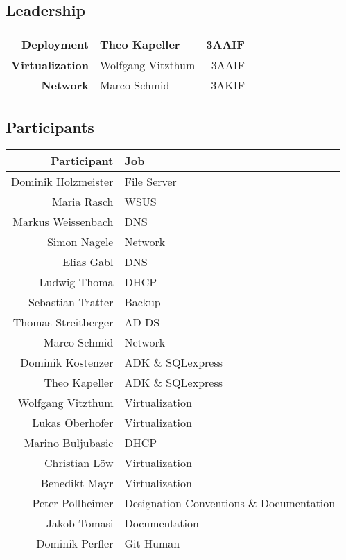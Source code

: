     
    \subsection{Leadership}
    \centering
    \begin{tabular}{rlr}
    	\hline 
    	\textbf{Deployment} & Theo Kapeller & 3AAIF \\ 
    	\hline 
    	\textbf{Virtualization} & Wolfgang Vitzthum & 3AAIF \\ 
    	\hline 
    	\textbf{Network} & Marco Schmid & 3AKIF \\ 
    	\hline 
    \end{tabular}
    \flushleft
    
    \subsection{Participants}
    \begin{table}[h]
    	\centering
		\begin{tabular}{r|l}
			\textbf{Participant} & \textbf{Job} \\ 
			\hline 
			Dominik Holzmeister & File Server \\ 

			\hline 
			Maria Rasch & WSUS \\ 
			\hline 
			Markus Weissenbach & DNS \\ 
			\hline 
			Simon Nagele & Network \\ 
			\hline 
			Elias Gabl & DNS \\ 
			\hline 
			Ludwig Thoma & DHCP \\ 
			\hline 
			Sebastian Tratter & Backup \\ 
			\hline 
			Thomas Streitberger & AD DS \\ 
			\hline 
			Marco Schmid & Network \\ 
			\hline 
			Dominik Kostenzer & ADK \& SQLexpress \\ 
			\hline 
			Theo Kapeller & ADK \& SQLexpress \\ 
			\hline 
			Wolfgang Vitzthum & Virtualization \\ 
			\hline 
			Lukas Oberhofer & Virtualization \\ 
			\hline 
			Marino Buljubasic & DHCP \\ 
			\hline 
			Christian Löw & Virtualization \\ 
			\hline 
			Benedikt Mayr & Virtualization \\ 
			\hline 
			Peter Pollheimer & Designation Conventions \& Documentation \\ 
			\hline 
			Jakob Tomasi & Documentation \\ 
			\hline 
			Dominik Perfler & Git-Human \\ 
			\hline 
		\end{tabular}
	\end{table}